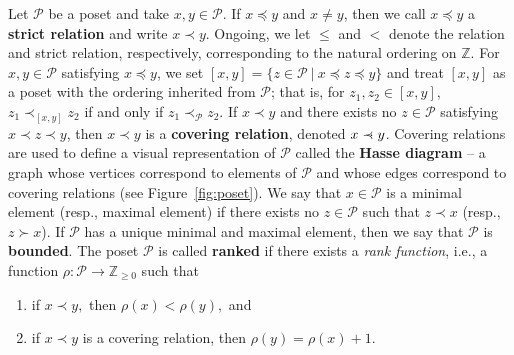 \documentclass[letterpaper,10pt]{article}
\newcommand{\precdot}{\prec\mathrel{\mkern-5mu}\mathrel{\cdot}}
\begin{document}
Let $\mathcal{P}$ be a poset and take $x,y\in\mathcal{P}$. If $x\preceq y$ and $x\neq y$, then we call $x\preceq y$ a \textbf{strict relation} and write $x\prec y$. Ongoing, we let $\le$ and $<$ denote the relation and strict relation, respectively, corresponding to the natural ordering on $\mathbb{Z}$. For $x,y\in\mathcal{P}$ satisfying $x\preceq y$, we set $[x,y]=\{z\in\mathcal{P}~|~x\preceq z\preceq y\}$ and treat $[x,y]$ as a poset with the ordering inherited from $\mathcal{P}$; that is, for $z_1,z_2\in [x,y]$, $z_1\prec_{[x,y]}z_2$ if and only if $z_1\prec_{\mathcal{P}}z_2$. If $x\prec y$ and there exists no $z\in \mathcal{P}$ satisfying $x\prec z\prec y$, then $x\prec y$ is a \textbf{covering relation}, denoted $x\precdot y$. Covering relations are used to define a visual representation of $\mathcal{P}$ called the \textbf{Hasse diagram} -- a graph whose vertices correspond to elements of $\mathcal{P}$ and whose edges correspond to covering relations (see Figure~\ref{fig:poset}). We say that $x\in\mathcal{P}$ is a minimal element (resp., maximal element) if there exists no $z\in\mathcal{P}$ such that $z\prec x$ (resp., $z\succ x$). If $\mathcal{P}$ has a unique minimal and maximal element, then we say that $\mathcal{P}$ is \textbf{bounded}. The poset $\mathcal{P}$ is called \textbf{ranked} if there exists a \textit{rank function}, i.e., a function $\rho:\mathcal{P}\to\mathbb{Z}_{\ge 0}$ such that
\begin{enumerate}
    \item if $x\prec y,$ then $\rho(x)<\rho(y),$ and
    \item if $x\prec y$ is a covering relation, then $\rho(y)=\rho(x)+1.$
\end{enumerate}
\end{document}
